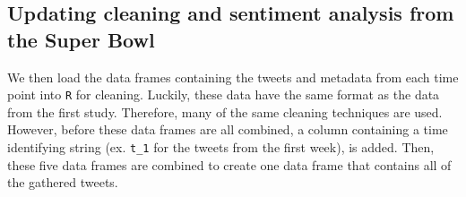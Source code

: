 \documentclass[12pt,twoside]{reedthesis}
\newenvironment{Shaded}{\begin{snugshade}}{\end{snugshade}}
\newcommand{\KeywordTok}[1]{\textcolor[rgb]{0.13,0.29,0.53}{\textbf{#1}}}
\newcommand{\DataTypeTok}[1]{\textcolor[rgb]{0.13,0.29,0.53}{#1}}
\newcommand{\DecValTok}[1]{\textcolor[rgb]{0.00,0.00,0.81}{#1}}
\newcommand{\StringTok}[1]{\textcolor[rgb]{0.31,0.60,0.02}{#1}}
\newcommand{\CommentTok}[1]{\textcolor[rgb]{0.56,0.35,0.01}{\textit{#1}}}
\newcommand{\ControlFlowTok}[1]{\textcolor[rgb]{0.13,0.29,0.53}{\textbf{#1}}}
\newcommand{\OperatorTok}[1]{\textcolor[rgb]{0.81,0.36,0.00}{\textbf{#1}}}
\newcommand{\NormalTok}[1]{#1}
\begin{document}
\subsection{Updating cleaning and sentiment analysis from the Super
Bowl}\label{updating-cleaning-and-sentiment-analysis-from-the-super-bowl}

We then load the data frames containing the tweets and metadata from
each time point into \texttt{R} for cleaning. Luckily, these data have
the same format as the data from the first study. Therefore, many of the
same cleaning techniques are used. However, before these data frames are
all combined, a column containing a time identifying string (ex.
\texttt{t\_1} for the tweets from the first week), is added. Then, these
five data frames are combined to create one data frame that contains all
of the gathered tweets.

\small
\begin{Shaded}
\end{Shaded}
\normalsize
\end{document}

